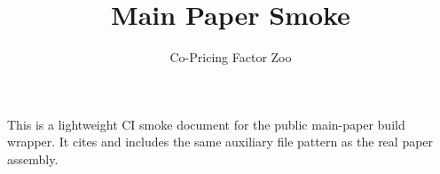 \documentclass{article}
\title{Main Paper Smoke}
\author{Co-Pricing Factor Zoo}
\date{}
\begin{document}
\maketitle

This is a lightweight CI smoke document for the public main-paper build wrapper.
It cites \cite{Smoke2026} and includes the same auxiliary file pattern as the
real paper assembly.







\end{document}

